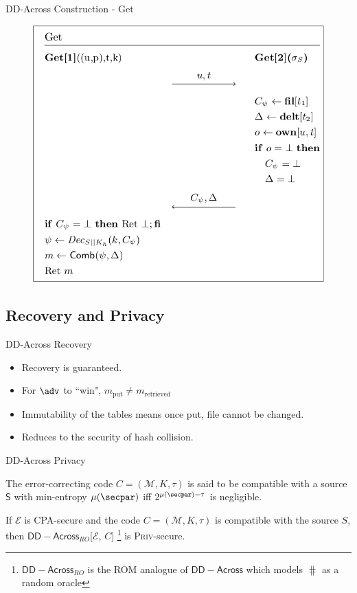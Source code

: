 \documentclass{beamer}
\newcommand{\scheme}{\mathsf{DD-Across}}
\newcommand{\msgspc}{\mathcal{M}}
\begin{document}
\begin{frame}{DD-Across Construction - Get}
		\begin{figure}[H]
    \centering
    \includegraphics[scale=0.35]{get}
	\end{figure}
\end{frame}

\subsection{Recovery and Privacy}

\begin{frame}{DD-Across Recovery}
	\begin{itemize}
		\setlength\itemsep{1em}
		\item Recovery is guaranteed.
		\item For $\adv$ to ``win", $m_{\text{put}} \neq m_{\text{retrieved}}$ 
		\item Immutability of the tables means once put, file cannot be changed.
		\item Reduces to the security of hash collision.
	\end{itemize}
\end{frame}

\begin{frame}{DD-Across Privacy}

		\begin{definition}
        The error-correcting code $C=(\msgspc, K, \tau)$ is said to be compatible with a source $\mathsf{S}$ with min-entropy $\mu(\secpar)$ iff $2^{\mu(\secpar)-\tau}$ is negligible.
        \label{def}
        \end{definition}
        \begin{theorem}
    If $\mathcal{E}$ is CPA-secure and the code $C=(\msgspc, K, \tau)$ is compatible with the source $S$, then $\scheme_{RO}$[$\mathcal{E}$, $C$] \footnote{$\scheme_{RO}$ is the ROM analogue of $\scheme$ which models $\hash$ as a random oracle} is \textsc{Priv}-secure.
\end{theorem} 

\end{frame}
\end{document}
